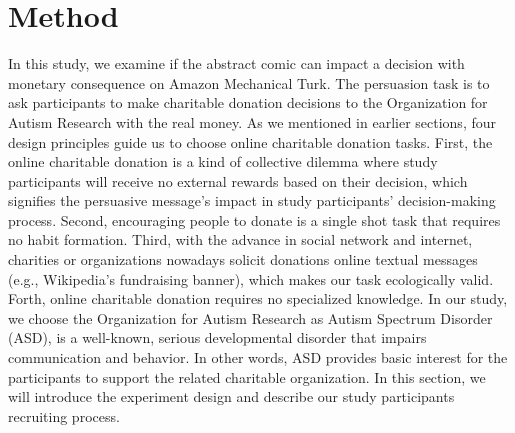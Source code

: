 \section{Method}
\label{sec:Method}
In this study, we examine if the abstract comic can impact a decision with monetary consequence on Amazon Mechanical Turk. The persuasion task is to ask participants to make charitable donation decisions to the Organization for Autism Research with the real money. As we mentioned in earlier sections, four design principles guide us to choose online charitable donation tasks. First, the online charitable donation is a kind of collective dilemma where study participants will receive no external rewards based on their decision, which signifies the persuasive message's impact in study participants' decision-making process. Second, encouraging people to donate is a single shot task that requires no habit formation. Third, with the advance in social network and internet, charities or organizations nowadays solicit donations online textual messages (e.g., Wikipedia's fundraising banner), which makes our task ecologically valid. Forth, online charitable donation requires no specialized knowledge. In our study, we choose the Organization for Autism Research as Autism Spectrum Disorder (ASD), is a well-known, serious developmental disorder that impairs communication and behavior. In other words, ASD provides basic interest for the participants to support the related charitable organization. In this section, we will introduce the experiment design and describe our study participants recruiting process.


